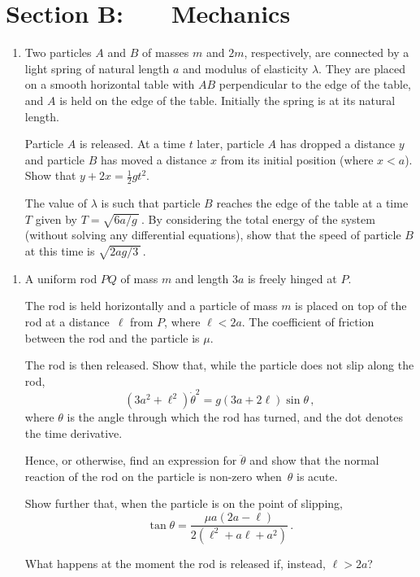 \documentclass[a4, 11pt]{report}
\newlength{\qspace}
\newcounter{qnumber}
\newenvironment{question}%
 {\vspace{\qspace}
  \begin{enumerate}[\bfseries 1\quad][10]%
    \setcounter{enumi}{\value{qnumber}}%
    \item%
 }
{
  \end{enumerate}
  \filbreak
  \stepcounter{qnumber}
 }
\begin{document}
\newpage
\section*{Section B: \ \ \ Mechanics}

\begin{question}

Two  particles  $A$  and  $B$ of masses	 $m$ and $2 m$,  respectively,
are connected  by a light spring	 of natural	 
length	  $a$   and  modulus of	 elasticity $\lambda$.	They 
are placed on a	  smooth horizontal table with	$AB$ 
perpendicular to the edge of the table,	and $A$ is  held on
the edge of the table.	  Initially  the  
spring	 is at  its  natural  length.  

Particle  $A$ is released. At a	 time	 $t$  later, 
particle $A$  has dropped a distance $y$  and particle $ B$ 
has moved a distance $x$ from its initial position (where $x<a$).
 Show  that $ y + 2x= \frac12 gt^2$. 

The value of $\lambda$ is such  that 
particle $B$  reaches the edge of the table at a time $T$ given by
$T= \sqrt{6a/g\,}\,$.  
By considering the total energy of the system (without solving any
differential equations), 
show that the speed of particle $B$ at this
time is $\sqrt{2ag/3\,}\,$.

\end{question}
\begin{question}
A uniform rod $PQ$ of mass $m$ and length $3a$ is freely  hinged at $P$.

The rod is held horizontally and a particle of mass $m$ is placed on
top of the rod at a distance~$\ell$ from $P$, where $\ell <2a$. 
The coefficient of friction between the rod and the particle is $\mu$.

The rod is then released. Show that, while the particle does not 
slip along the rod,
\[
(3a^2+\ell^2)\dot \theta^2 = g(3a+2\ell)\sin\theta \,,
\]
where $\theta$ is the angle through which the rod 
has turned,
and the dot denotes the time derivative.

Hence, or otherwise, find an expression for $\ddot \theta$ and
 show 
that
the normal reaction of the rod on the 
particle is non-zero
 when~$\theta$ is acute. 

Show further that, when the particle is on the point of slipping,
\[
\tan\theta = \frac{\mu a (2a-\ell)}{2(\ell^2 + a\ell +a^2)}
\,.
\]  

What happens at the moment the rod is released  if, instead,  $\ell>2a$?


\end{question}
\end{document}
